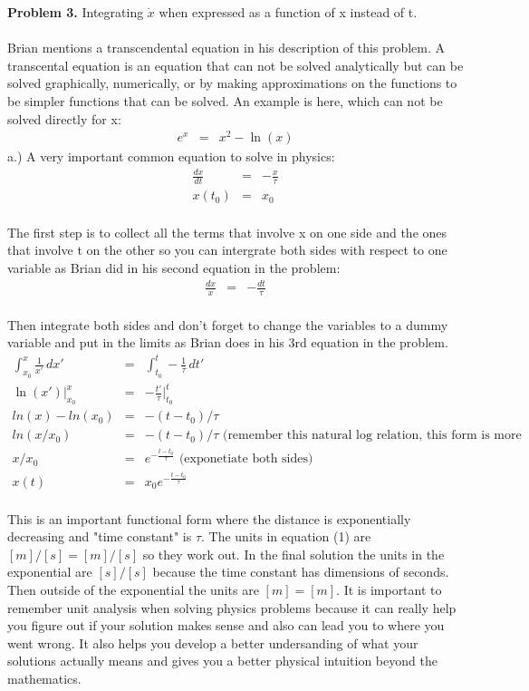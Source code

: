 \documentclass[11pt]{amsart}
\begin{document}
\textbf{Problem 3.} Integrating $\dot{x}$ when expressed as a function of x instead of t. \\  \\
Brian mentions a transcendental equation in his description of this problem. A transcental equation is an equation that can not be solved analytically but can be solved graphically, numerically, or by making approximations on the functions to be simpler functions that can be solved. An example is here, which can not be solved directly for x: \\ 
\begin{eqnarray*}
e^{x} &=& x^{2} - \ln(x) 
\end{eqnarray*}
a.) A very important common equation to solve in physics: \\ 
\begin{eqnarray*} 
\frac{dx}{dt} &=& -\frac{x}{\tau} \\
x(t_{0}) &=& x_{0} 
\end{eqnarray*}  \\
The first step is to collect all the terms that involve x on one side and the ones that involve t on the other so you can intergrate both sides with respect to one variable as Brian did in his second equation in the problem: \\ 
\begin{eqnarray*} 
\frac{dx}{x} &=& -\frac{dt}{\tau} 
\end{eqnarray*} \\
Then integrate both sides and don't forget to change the variables to a dummy variable and put in the limits as Brian does in his 3rd equation in the problem. \\ 
\begin{eqnarray*} 
\int^{x}_{x_{0}}\frac{1}{x'}\,dx' &=& \int^{t}_{t_{0}}-\frac{1}{\tau}\,dt' \\
\ln(x')|^{x}_{x_{0}} &=& -\frac{t'}{\tau}|^{t}_{t_{0}} \\
ln(x) - ln(x_{0}) &=& -(t - t_{0})/\tau \\
ln(x/x_{0}) &=& -(t - t_{0})/\tau  \mbox{ (remember this natural log relation, this form is more common)} \\
x/x_{0} &=& e^{-\frac{t-t_{0}}{\tau}} \mbox{ (exponetiate both sides)} \\
x(t) &=& x_{0}e^{-\frac{t-t_{0}}{\tau}} 
\end{eqnarray*}  \\
This is an important functional form where the distance is exponentially decreasing and "time constant" is $\tau$.  The units in equation (1) are $[m]/[s] = [m]/[s]$ so they work out. In the final solution the units in the exponential are $[s]/[s]$ because the time constant has dimensions of seconds. Then outside of the exponential the units are $[m]=[m]$. It is important to remember unit analysis when solving physics problems because it can really help you figure out if your solution makes sense and also can lead you to where you went wrong. It also helps you develop a better undersanding of what your solutions actually means and gives you a better physical intuition beyond the mathematics. \\ \\
\end{document}
